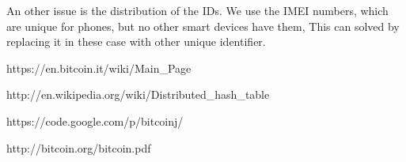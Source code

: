 \documentclass[a4paper,12pt]{article}
\begin{document}
An other issue is the distribution of the IDs. We use the IMEI numbers, which are unique for phones, but no other smart devices have them, This can solved by replacing it in these case with other unique identifier. 


\begin{thebibliography}{99}
\bibitem{}
https://en.bitcoin.it/wiki/Main\_Page
\label{bitcoinwiki}

\bibitem{}
http://en.wikipedia.org/wiki/Distributed\_hash\_table
\label{dhtwiki}

\bibitem{}
https://code.google.com/p/bitcoinj/
\label{bitcoinj}

\bibitem{}
http://bitcoin.org/bitcoin.pdf
\label{shatoshi}

\end{thebibliography}
\end{document}
